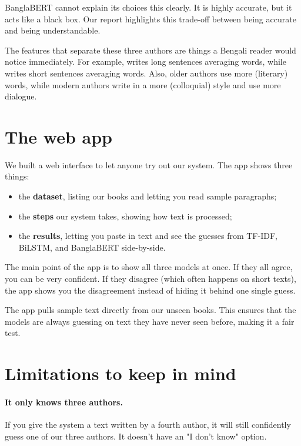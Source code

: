 BanglaBERT cannot explain its choices this clearly. It is highly accurate, but it acts like a black box. Our report highlights this trade-off between being accurate and being understandable.

The features that separate these three authors are things a Bengali reader would notice immediately. For example, \longestSentAuthor{} writes long sentences averaging \longestSentLen{} words, while \shortestSentAuthor{} writes short sentences averaging \shortestSentLen{} words. Also, older authors use more  (literary) words, while modern authors write in a more  (colloquial) style and use more dialogue.

\section{The web app}

We built a web interface to let anyone try out our system. The app shows three things:

\begin{itemize}
  \item the \textbf{dataset}, listing our books and letting you read sample paragraphs;
  \item the \textbf{steps} our system takes, showing how text is processed;
  \item the \textbf{results}, letting you paste in text and see the guesses from TF-IDF, BiLSTM, and BanglaBERT side-by-side.
\end{itemize}

The main point of the app is to show all three models at once. If they all agree, you can be very confident. If they disagree (which often happens on short texts), the app shows you the disagreement instead of hiding it behind one single guess.

The app pulls sample text directly from our unseen books. This ensures that the models are always guessing on text they have never seen before, making it a fair test.

\section{Limitations to keep in mind}
\label{sec:limitations}

\paragraph{It only knows three authors.} If you give the system a text written by a fourth author, it will still confidently guess one of our three authors. It doesn't have an "I don't know" option.

